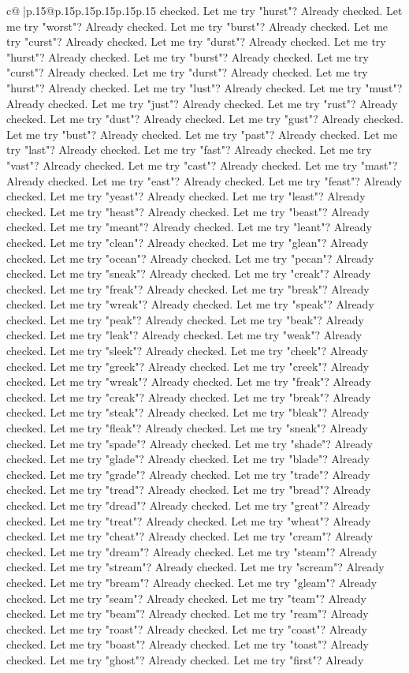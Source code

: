 \documentclass{article}
\begin{document}
{\begin{supertabular}{c@{$\;$}|p{.15\linewidth}@{}p{.15\linewidth}p{.15\linewidth}p{.15\linewidth}p{.15\linewidth}p{.15\linewidth}}
{{{checked. Let me try "hurst"? Already checked. Let me try "worst"? Already checked. Let me try "burst"? Already checked. Let me try "curst"? Already checked. Let me try "durst"? Already checked. Let me try "hurst"? Already checked. Let me try "burst"? Already checked. Let me try "curst"? Already checked. Let me try "durst"? Already checked. Let me try "hurst"? Already checked. Let me try "lust"? Already checked. Let me try "must"? Already checked. Let me try "just"? Already checked. Let me try "rust"? Already checked. Let me try "dust"? Already checked. Let me try "gust"? Already checked. Let me try "bust"? Already checked. Let me try "past"? Already checked. Let me try "last"? Already checked. Let me try "fast"? Already checked. Let me try "vast"? Already checked. Let me try "cast"? Already checked. Let me try "mast"? Already checked. Let me try "east"? Already checked. Let me try "feast"? Already checked. Let me try "yeast"? Already checked. Let me try "least"? Already checked. Let me try "heast"? Already checked. Let me try "beast"? Already checked. Let me try "meant"? Already checked. Let me try "leant"? Already checked. Let me try "clean"? Already checked. Let me try "glean"? Already checked. Let me try "ocean"? Already checked. Let me try "pecan"? Already checked. Let me try "sneak"? Already checked. Let me try "creak"? Already checked. Let me try "freak"? Already checked. Let me try "break"? Already checked. Let me try "wreak"? Already checked. Let me try "speak"? Already checked. Let me try "peak"? Already checked. Let me try "beak"? Already checked. Let me try "leak"? Already checked. Let me try "weak"? Already checked. Let me try "sleek"? Already checked. Let me try "cheek"? Already checked. Let me try "greek"? Already checked. Let me try "creek"? Already checked. Let me try "wreak"? Already checked. Let me try "freak"? Already checked. Let me try "creak"? Already checked. Let me try "break"? Already checked. Let me try "steak"? Already checked. Let me try "bleak"? Already checked. Let me try "fleak"? Already checked. Let me try "sneak"? Already checked. Let me try "spade"? Already checked. Let me try "shade"? Already checked. Let me try "glade"? Already checked. Let me try "blade"? Already checked. Let me try "grade"? Already checked. Let me try "trade"? Already checked. Let me try "tread"? Already checked. Let me try "bread"? Already checked. Let me try "dread"? Already checked. Let me try "great"? Already checked. Let me try "treat"? Already checked. Let me try "wheat"? Already checked. Let me try "cheat"? Already checked. Let me try "cream"? Already checked. Let me try "dream"? Already checked. Let me try "steam"? Already checked. Let me try "stream"? Already checked. Let me try "scream"? Already checked. Let me try "bream"? Already checked. Let me try "gleam"? Already checked. Let me try "seam"? Already checked. Let me try "team"? Already checked. Let me try "beam"? Already checked. Let me try "ream"? Already checked. Let me try "roast"? Already checked. Let me try "coast"? Already checked. Let me try "boast"? Already checked. Let me try "toast"? Already checked. Let me try "ghost"? Already checked. Let me try "first"? Already }}}
\end{supertabular}}
\end{document}
